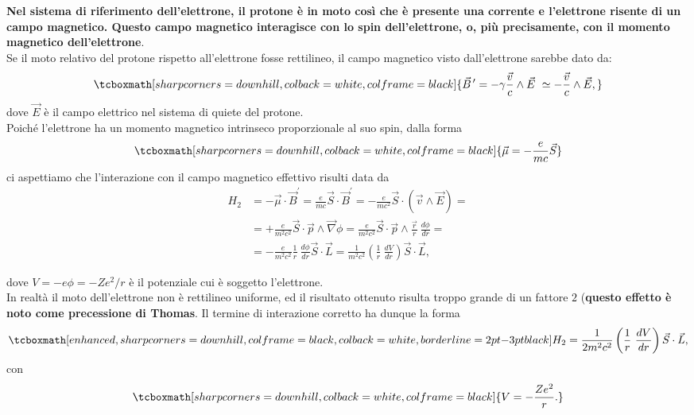 \documentclass[a4paper,12pt,oneside]{book}
\begin{document}
\textbf{Nel sistema di riferimento dell'elettrone, il protone è in moto così che è presente una corrente e l'elettrone risente di un campo magnetico. Questo campo magnetico interagisce con lo spin dell'elettrone, o, più precisamente, con il momento magnetico dell'elettrone}. \\

Se il moto relativo del protone rispetto all'elettrone fosse rettilineo, il campo magnetico visto dall'elettrone sarebbe dato da:
	\begin{equation} 
		\tcboxmath[sharp corners=downhill, colback=white, colframe=black]{	
			\vec{B}^{\, \prime}=-\gamma \frac{\vec{v}}{c} \wedge \vec{E} \ \simeq -\frac{\vec{v}}{c} \wedge \vec{E} ,
			}
	\end{equation}
dove $\vec{E}$ è il campo elettrico nel sistema di quiete del protone. \\

Poiché l'elettrone ha un momento magnetico intrinseco proporzionale al suo spin, dalla forma
	\begin{equation} 
		\tcboxmath[sharp corners=downhill, colback=white, colframe=black]{
			\vec{\mu}=-\frac{e}{mc}\vec{S}
			}
	\end{equation}
ci aspettiamo che l'interazione con il campo magnetico effettivo risulti data da
	\begin{align}
		H_2 & =  -\vec{\mu} \cdot \vec{B}^{'}=\frac{e}{mc} \vec{S} \cdot \vec{B}^{'}= -\frac{e}{mc^2}\vec{S} \cdot \left( \vec{v} \wedge \vec{E} \right)= \nonumber \\
		& =  + \frac{e}{m^2c^2}\vec{S} \cdot \vec{p} \wedge \vec{\nabla}\phi= \frac{e}{m^2c^2}\vec{S} \cdot \vec{p} \wedge \frac{\vec{r}}{r} \ \frac{d\phi}{dr}= \nonumber \\
		& =  -\frac{e}{m^2c^2}\frac{1}{r} \ \frac{d\phi}{dr}\vec{S} \cdot \vec{L}= \frac{1}{m^2c^2} \left( \frac{1}{r} \ \frac{dV}{dr} \right) \vec{S} \cdot \vec{L} ,
	\end{align}

dove $V=-e\phi=- Z e^2/r$ è il potenziale cui è soggetto l'elettrone. \\

In realtà il moto dell'elettrone non è rettilineo uniforme, ed il risultato ottenuto risulta troppo grande di un fattore $2$ (\textbf{questo effetto è noto come precessione di Thomas}. Il termine di interazione corretto ha dunque la forma
	\begin{equation}
	\label{eq:cap25_3}
		\tcboxmath[enhanced, sharp corners=downhill, colframe=black, colback=white, borderline={2pt}{-3pt}{black}]{
			H_2=\frac{1}{2m^2c^2} \left( \frac{1}{r} \ \frac{dV}{dr} \right) \vec{S} \cdot \vec{L} ,
			}
	\end{equation}
con
	\begin{equation} 
		\tcboxmath[sharp corners=downhill, colback=white, colframe=black]{
		V=-\frac{ Z e^2}{r} .
		}
	\end{equation}\\
	
\end{document}
